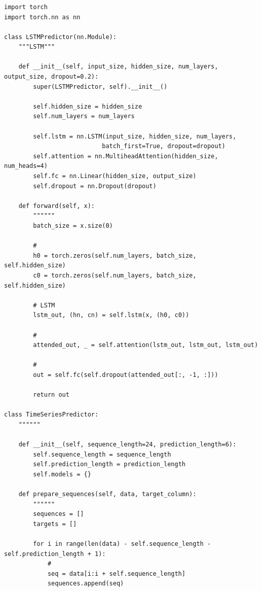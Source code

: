 \hypertarget{section-101}{%
\subsubsection{}\label{section-101}}

\begin{lstlisting}[style=python]
import torch
import torch.nn as nn

class LSTMPredictor(nn.Module):
    """LSTM"""
    
    def __init__(self, input_size, hidden_size, num_layers, output_size, dropout=0.2):
        super(LSTMPredictor, self).__init__()
        
        self.hidden_size = hidden_size
        self.num_layers = num_layers
        
        self.lstm = nn.LSTM(input_size, hidden_size, num_layers, 
                           batch_first=True, dropout=dropout)
        self.attention = nn.MultiheadAttention(hidden_size, num_heads=4)
        self.fc = nn.Linear(hidden_size, output_size)
        self.dropout = nn.Dropout(dropout)
        
    def forward(self, x):
        """"""
        batch_size = x.size(0)
        
        # 
        h0 = torch.zeros(self.num_layers, batch_size, self.hidden_size)
        c0 = torch.zeros(self.num_layers, batch_size, self.hidden_size)
        
        # LSTM
        lstm_out, (hn, cn) = self.lstm(x, (h0, c0))
        
        # 
        attended_out, _ = self.attention(lstm_out, lstm_out, lstm_out)
        
        # 
        out = self.fc(self.dropout(attended_out[:, -1, :]))
        
        return out

class TimeSeriesPredictor:
    """"""
    
    def __init__(self, sequence_length=24, prediction_length=6):
        self.sequence_length = sequence_length
        self.prediction_length = prediction_length
        self.models = {}
        
    def prepare_sequences(self, data, target_column):
        """"""
        sequences = []
        targets = []
        
        for i in range(len(data) - self.sequence_length - self.prediction_length + 1):
            # 
            seq = data[i:i + self.sequence_length]
            sequences.append(seq)
            

\end{lstlisting}
